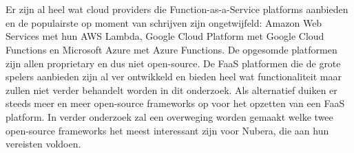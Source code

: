 \\\\
Er zijn al heel wat cloud providers die Function-as-a-Service platforms aanbieden en de populairste op moment van schrijven zijn ongetwijfeld: Amazon Web Services met hun AWS Lambda, Google Cloud Platform met Google Cloud Functions en Microsoft Azure met Azure Functions. De opgesomde platformen zijn allen proprietary en dus niet open-source. De FaaS platformen die de grote spelers aanbieden zijn al ver ontwikkeld en bieden heel wat functionaliteit maar zullen niet verder behandelt worden in dit onderzoek. Als alternatief duiken er steeds meer en meer open-source frameworks op voor het opzetten van een FaaS platform. In verder onderzoek zal een overweging worden gemaakt welke twee open-source frameworks het meest interessant zijn voor Nubera, die aan hun vereisten voldoen.
